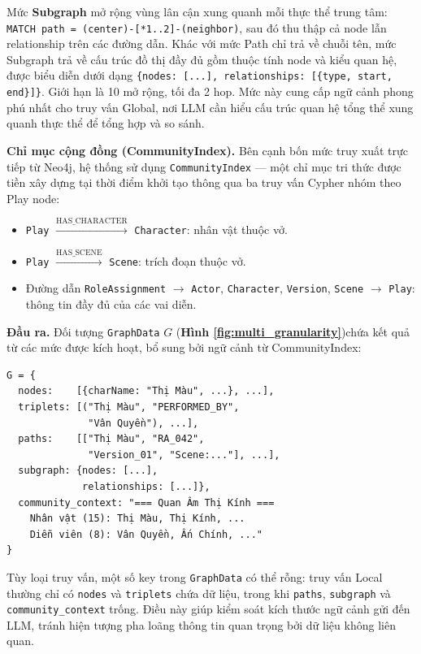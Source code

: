 Mức \textbf{Subgraph} mở rộng vùng lân cận xung quanh mỗi thực thể trung tâm: \texttt{MATCH path = (center)-[*1..2]-(neighbor)}, sau đó thu thập cả node lẫn relationship trên các đường dẫn. Khác với mức Path chỉ trả về chuỗi tên, mức Subgraph trả về cấu trúc đồ thị đầy đủ gồm thuộc tính node và kiểu quan hệ, được biểu diễn dưới dạng \texttt{\{nodes: [...], relationships: [\{type, start, end\}]\}}. Giới hạn là 10 mở rộng, tối đa 2 hop. Mức này cung cấp ngữ cảnh phong phú nhất cho truy vấn Global, nơi LLM cần hiểu cấu trúc quan hệ tổng thể xung quanh thực thể để tổng hợp và so sánh.

\textbf{Chỉ mục cộng đồng (CommunityIndex).} Bên cạnh bốn mức truy xuất trực tiếp từ Neo4j, hệ thống sử dụng \texttt{CommunityIndex} --- một chỉ mục tri thức được tiền xây dựng tại thời điểm khởi tạo thông qua ba truy vấn Cypher nhóm theo Play node:
\begin{itemize}
  \item \texttt{Play} $\xrightarrow{\text{HAS\_CHARACTER}}$ \texttt{Character}: nhân vật thuộc vở.
  \item \texttt{Play} $\xrightarrow{\text{HAS\_SCENE}}$ \texttt{Scene}: trích đoạn thuộc vở.
  \item Đường dẫn \texttt{RoleAssignment} $\rightarrow$ \texttt{Actor}, \texttt{Character}, \texttt{Version}, \texttt{Scene} $\rightarrow$ \texttt{Play}: thông tin đầy đủ của các vai diễn.
\end{itemize}

\textbf{Đầu ra.} Đối tượng \texttt{GraphData} $G$ (\textbf{Hình \ref{fig:multi_granularity}})chứa kết quả từ các mức được kích hoạt, bổ sung bởi ngữ cảnh từ CommunityIndex:

\begin{tcolorbox}[colback=gray!5, colframe=black!50, arc=4pt, boxrule=0.5pt]
{\small
\begin{verbatim}
G = {
  nodes:    [{charName: "Thị Màu", ...}, ...],
  triplets: [("Thị Màu", "PERFORMED_BY",
              "Vân Quyền"), ...],
  paths:    [["Thị Màu", "RA_042",
              "Version_01", "Scene:..."], ...],
  subgraph: {nodes: [...],
             relationships: [...]},
  community_context: "=== Quan Âm Thị Kính ===
    Nhân vật (15): Thị Màu, Thị Kính, ...
    Diễn viên (8): Vân Quyền, Ấn Chính, ..."
}
\end{verbatim}
}
\end{tcolorbox}

Tùy loại truy vấn, một số key trong \texttt{GraphData} có thể rỗng: truy vấn Local thường chỉ có \texttt{nodes} và \texttt{triplets} chứa dữ liệu, trong khi \texttt{paths}, \texttt{subgraph} và \texttt{community\_context} trống. Điều này giúp kiểm soát kích thước ngữ cảnh gửi đến LLM, tránh hiện tượng pha loãng thông tin quan trọng bởi dữ liệu không liên quan.

